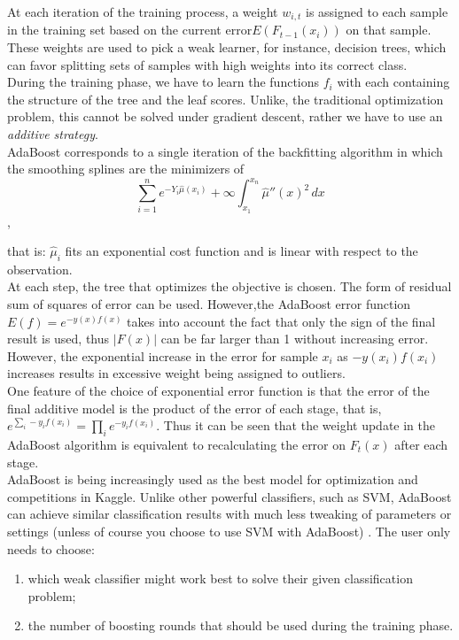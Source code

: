 \documentclass[letterpaper, 10 pt, conference]{ieeeconf}  %
\begin{document}
At each iteration of the training process, a weight $w_{i,t}$ is assigned to each sample in the training set based on the current error$E(F_{t-1}(x_i))$ on that sample. These weights are used to pick a weak learner, for instance, decision trees, which can favor splitting sets of samples with high weights into its correct class. \\

During the training phase, we have to learn the functions $f_{i}$ with each containing the structure of the tree and the leaf scores. Unlike, the traditional optimization problem, this cannot be solved under gradient descent, rather we have to use an \textit{additive strategy}. \\

AdaBoost corresponds to a single iteration of the backfitting algorithm in which the smoothing splines are the minimizers of 
    $$\sum_{i=1}^n e^{-Y_i \hat\mu(x_i)} + \infty \int_{x_1}^{x_n} \hat\mu''(x)^2 \,dx$$,
    
that is: ${\hat {\mu }}_{i}$ fits an exponential cost function and is linear with respect to the observation.\\
 
At each step, the tree that optimizes the objective is chosen. The form of residual sum of squares of error can be used. However,the AdaBoost error function $E(f) = e^{-y(x)f(x)}$ takes into account the fact that only the sign of the final result is used, thus $|F(x)|$ can be far larger than 1 without increasing error. However, the exponential increase in the error for sample $x_{i}$ as $-y(x_i)f(x_i)$ increases results in excessive weight being assigned to outliers. \\

One feature of the choice of exponential error function is that the error of the final additive model is the product of the error of each stage, that is, $e^{\sum_i -y_i f(x_i)} = \prod_i e^{-y_i f(x_i)}$. Thus it can be seen that the weight update in the AdaBoost algorithm is equivalent to recalculating the error on $F_t(x)$ after each stage. \\

AdaBoost is being increasingly used as the best model for optimization and competitions in Kaggle. Unlike other powerful classifiers, such as SVM, AdaBoost can achieve similar classification results with much less tweaking of parameters or settings (unless of course you choose to use SVM with AdaBoost) \cite{c11}. The user only needs to choose: 
\begin{enumerate}
\item which weak classifier might work best to solve their given classification problem; 
\item the number of boosting rounds that should be used during the training phase. 
\end{enumerate}  \\
\end{document}
